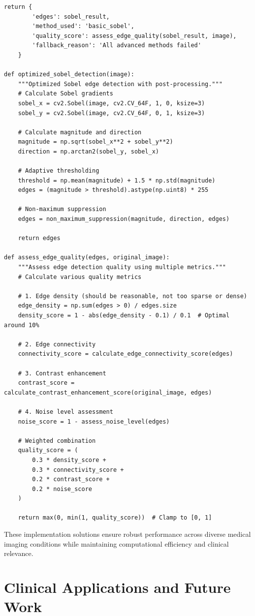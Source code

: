 \documentclass[conference]{IEEEtran}
\begin{document}
\begin{lstlisting}[caption={Intelligent fallback system with performance monitoring}]
    return {
        'edges': sobel_result,
        'method_used': 'basic_sobel',
        'quality_score': assess_edge_quality(sobel_result, image),
        'fallback_reason': 'All advanced methods failed'
    }

def optimized_sobel_detection(image):
    """Optimized Sobel edge detection with post-processing."""
    # Calculate Sobel gradients
    sobel_x = cv2.Sobel(image, cv2.CV_64F, 1, 0, ksize=3)
    sobel_y = cv2.Sobel(image, cv2.CV_64F, 0, 1, ksize=3)
    
    # Calculate magnitude and direction
    magnitude = np.sqrt(sobel_x**2 + sobel_y**2)
    direction = np.arctan2(sobel_y, sobel_x)
    
    # Adaptive thresholding
    threshold = np.mean(magnitude) + 1.5 * np.std(magnitude)
    edges = (magnitude > threshold).astype(np.uint8) * 255
    
    # Non-maximum suppression
    edges = non_maximum_suppression(magnitude, direction, edges)
    
    return edges

def assess_edge_quality(edges, original_image):
    """Assess edge detection quality using multiple metrics."""
    # Calculate various quality metrics
    
    # 1. Edge density (should be reasonable, not too sparse or dense)
    edge_density = np.sum(edges > 0) / edges.size
    density_score = 1 - abs(edge_density - 0.1) / 0.1  # Optimal around 10%
    
    # 2. Edge connectivity
    connectivity_score = calculate_edge_connectivity_score(edges)
    
    # 3. Contrast enhancement
    contrast_score = calculate_contrast_enhancement_score(original_image, edges)
    
    # 4. Noise level assessment
    noise_score = 1 - assess_noise_level(edges)
    
    # Weighted combination
    quality_score = (
        0.3 * density_score +
        0.3 * connectivity_score +
        0.2 * contrast_score +
        0.2 * noise_score
    )
    
    return max(0, min(1, quality_score))  # Clamp to [0, 1]
\end{lstlisting}

These implementation solutions ensure robust performance across diverse medical imaging conditions while maintaining computational efficiency and clinical relevance.

\section{Clinical Applications and Future Work}
\end{document}
